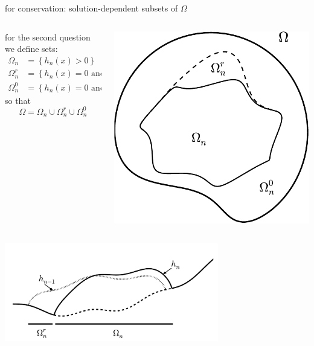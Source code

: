 \documentclass[hide notes,intlimits]{beamer}
\begin{document}
\begin{frame}{for conservation: solution-dependent subsets of $\Omega$}

\vspace{3mm}
\begin{columns}
\begin{column}{0.65\textwidth}
for the second question we define sets:
\begin{align*}
\Omega_n &= \left\{h_n(x)>0\right\} \\
\Omega_n^r &= \left\{h_n(x)=0 \text{ and } h_{n-1}(x) > 0\right\} \\
\Omega_n^0 &= \left\{h_n(x)=0 \text{ and } h_{n-1}(x) = 0\right\}
\end{align*}
so that
   $$\Omega = \Omega_n \cup \Omega_n^r \cup \Omega_n^0$$
\end{column}
\begin{column}{0.35\textwidth}
\includegraphics[width=1.0\textwidth,keepaspectratio=true]{domains-fig}
\end{column}
\end{columns}

\begin{center}
\includegraphics[width=0.7\textwidth,keepaspectratio=true]{cartoon-sets}
\end{center}
\end{frame}
\end{document}
